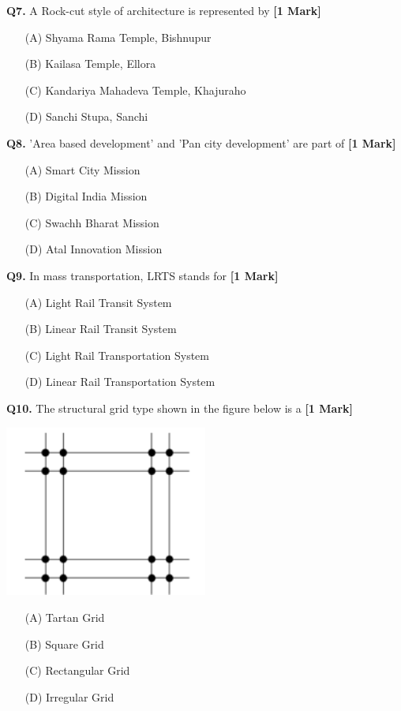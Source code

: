 \documentclass[11pt]{article}
\newcommand{\questiona}[2]{
    \noindent\textbf{Q#2.} #1 \hfill \textbf{[1 Mark]}
}
\begin{document}
\questiona{A Rock-cut style of architecture is represented by}{7}
\begin{enumerate}
    \item[(A)] Shyama Rama Temple, Bishnupur  
    \item[(B)] Kailasa Temple, Ellora  
    \item[(C)] Kandariya Mahadeva Temple, Khajuraho  
    \item[(D)] Sanchi Stupa, Sanchi  
\end{enumerate}
\vspace{0.5cm}

\questiona{'Area based development' and 'Pan city development' are part of}{8}
\begin{enumerate}
    \item[(A)] Smart City Mission  
    \item[(B)] Digital India Mission  
    \item[(C)] Swachh Bharat Mission  
    \item[(D)] Atal Innovation Mission  
\end{enumerate}
\vspace{0.5cm}

\questiona{In mass transportation, LRTS stands for}{9}
\begin{enumerate}
    \item[(A)] Light Rail Transit System  
    \item[(B)] Linear Rail Transit System  
    \item[(C)] Light Rail Transportation System  
    \item[(D)] Linear Rail Transportation System  
\end{enumerate}
\vspace{0.5cm}

\questiona{The structural grid type shown in the figure below is a}{10}
\begin{center}
\includegraphics[width=0.5\textwidth]{figures/10a.png}
\end{center}
\begin{enumerate}
    \item[(A)] Tartan Grid  
    \item[(B)] Square Grid  
    \item[(C)] Rectangular Grid  
    \item[(D)] Irregular Grid  
\end{enumerate}
\vspace{0.5cm}
\end{document}

